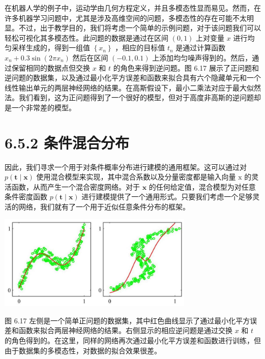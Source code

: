 \documentclass[10pt]{report}
\begin{document}
在机器人学的例子中，运动学由几何方程定义，并且多模态性显而易见。然而，在许多机器学习问题中，尤其是涉及高维空间的问题，多模态性的存在可能不太明显。不过，出于教学目的，我们将考虑一个简单的示例问题，对于该问题我们可以轻松可视化其多模态性。此问题的数据是通过在区间 \(\left( {0,1}\right)\) 上对变量 \(x\) 进行均匀采样生成的，得到一组值 \(\left\{  {x}_{n}\right\}\) ，相应的目标值 \({t}_{n}\) 是通过计算函数 \({x}_{n} + {0.3}\sin \left( {{2\pi }{x}_{n}}\right)\) 然后在区间 \(\left( {-{0.1},{0.1}}\right)\) 上添加均匀噪声得到的。然后，通过保留相同的数据点但交换 \(x\) 和 \(t\) 的角色来得到逆问题。图 6.17 展示了正问题和逆问题的数据集，以及通过最小化平方误差和函数来拟合具有六个隐藏单元和一个线性输出单元的两层神经网络的结果。在高斯假设下，最小二乘法对应于最大似然法。我们看到，这为正问题得到了一个很好的模型，但对于高度非高斯的逆问题却是一个非常差的模型。

\section*{6.5.2 条件混合分布}

因此，我们寻求一个用于对条件概率分布进行建模的通用框架。这可以通过对 \(p\left( {\mathbf{t} \mid  \mathbf{x}}\right)\) 使用混合模型来实现，其中混合系数以及分量密度都是输入向量 \(\mathrm{x}\) 的灵活函数，从而产生一个混合密度网络。对于 \(\mathbf{x}\) 的任何给定值，混合模型为对任意条件密度函数 \(p\left( {\mathbf{t} \mid  \mathbf{x}}\right)\) 进行建模提供了一个通用形式。只要我们考虑一个足够灵活的网络，我们就有了一个用于近似任意条件分布的框架。

\begin{center}
\includegraphics[max width=0.7\textwidth]{images/0194e279-9b28-703a-88f4-c3ac21e2010d_218_665_1562_872_424_0.jpg}
\end{center}
\hspace*{3em} 

图 6.17 左侧是一个简单正问题的数据集，其中红色曲线显示了通过最小化平方误差和函数来拟合两层神经网络的结果。右侧显示的相应逆问题是通过交换 \(x\) 和 \(t\) 的角色得到的。在这里，同样的网络再次通过最小化平方误差和函数进行训练，但由于数据集的多模态性，对数据的拟合效果很差。
\end{document}

